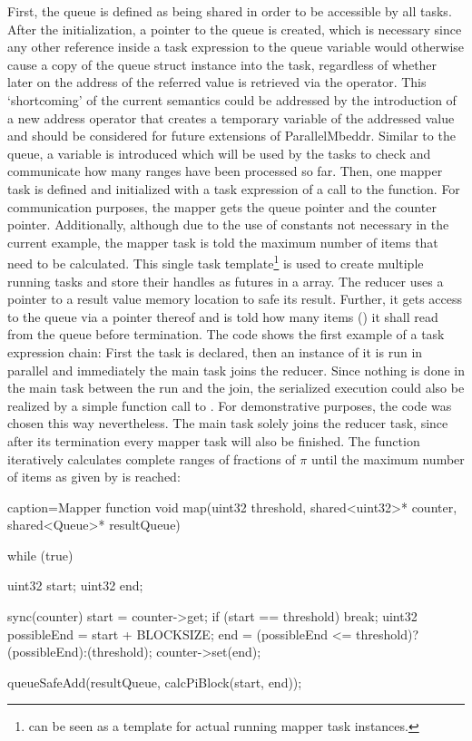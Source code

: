 First, the queue is defined as being shared in order to be accessible by all tasks. After the initialization, a pointer to the queue is created, which is necessary since any other reference inside a task expression to the queue variable would otherwise cause a copy of the queue struct instance into the task, regardless of whether later on the address of the referred value is retrieved via the \CODE{\&} operator. This `shortcoming' of the current semantics could be addressed by the introduction of a new address operator that creates a temporary variable of the addressed value and should be considered for future extensions of ParallelMbeddr. Similar to the queue, a  variable is introduced which will be used by the tasks to check and communicate how many ranges have been processed so far. Then, one mapper task is defined and initialized with a task expression of a call to the  function. For communication purposes, the mapper gets the queue pointer and the counter pointer. Additionally, although due to the use of constants not necessary in the current example, the mapper task is told the maximum number of items that need to be calculated. This single task template\footnote{ can be seen as a template for actual running mapper task instances.} is used to create multiple running tasks and store their handles as futures in a  array. The reducer uses a pointer to a result value memory location to safe its result. Further, it gets access to the queue via a pointer thereof and is told how many items () it shall read from the queue before termination. The code shows the first example of a task expression chain: First the task is declared, then an instance of it is run in parallel and immediately the main task joins the reducer. Since nothing is done in the main task between the run and the join, the serialized execution could also be realized by a simple function call to . For demonstrative purposes, the code was chosen this way nevertheless. The main task solely joins the reducer task, since after its termination every mapper task will also be finished.
The  function iteratively calculates complete ranges of fractions of $\pi$ until the maximum number of items as given by  is reached:
\begin{ccode}{caption=Mapper function}
void map(uint32 threshold, shared<uint32>* counter, shared<Queue>* resultQueue) { 
  while (true) { 
    uint32 start; 
    uint32 end; 
     
    sync(counter) { 
      start = counter->get; 
      if (start == threshold) { 
        break; 
      } 
      uint32 possibleEnd = start + BLOCKSIZE; 
      end = (possibleEnd <= threshold)?(possibleEnd):(threshold); 
      counter->set(end); 
    } 
     
    queueSafeAdd(resultQueue, calcPiBlock(start, end)); 
  } 
}
\end{ccode}
